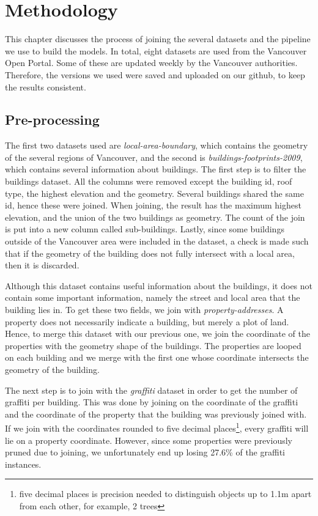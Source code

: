 \chapter{Methodology}


This chapter discusses the process of joining the several datasets and the pipeline we use to build the models. In total, eight datasets are used from the Vancouver Open Portal. Some of these are updated weekly by the Vancouver authorities. Therefore, the versions we used were saved and uploaded on our github, to keep the results consistent.

\section{Pre-processing}

The first two datasets used are \textit{local-area-boundary}, which contains the geometry of the several regions of Vancouver, and the second is \textit{buildings-footprints-2009}, which contains several information about buildings. The first step is to filter the buildings dataset. All the columns were removed except the building id, roof type, the highest elevation and the geometry. Several buildings shared the same id, hence these were joined. When joining, the result has the maximum highest elevation, and the union of the two buildings as geometry. The count of the join is put into a new column called sub-buildings. Lastly, since some buildings outside of the Vancouver area were included in the dataset, a check is made such that if the geometry of the building does not fully intersect with a local area, then it is discarded.

Although this dataset contains useful information about the buildings, it does not contain some important information, namely the street and local area that the building lies in. To get these two fields, we join with \textit{property-addresses}. A property does not necessarily indicate a building, but merely a plot of land. Hence, to merge this dataset with our previous one, we join the coordinate of the properties with the geometry shape of the buildings. The properties are looped on each building and we merge with the first one whose coordinate intersects the geometry of the building.

The next step is to join with the \textit{graffiti} dataset in order to get the number of graffiti per building. This was done by joining on the coordinate of the graffiti and the coordinate of the property that the building was previously joined with. If we join with the coordinates rounded to five decimal places\footnote{five decimal places is precision needed to distinguish objects up to 1.1m apart from each other, for example, 2 trees}, every graffiti will lie on a property coordinate. However, since some properties were previously pruned due to joining, we unfortunately end up losing 27.6\% of the graffiti instances.


